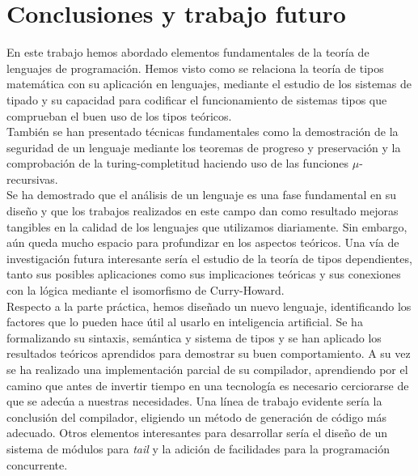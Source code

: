 \chapter{Conclusiones y trabajo futuro}
\label{sect:con}

En este trabajo hemos abordado elementos fundamentales de la teoría de lenguajes de programación. Hemos visto como se relaciona la teoría de tipos matemática con su aplicación en lenguajes, mediante el estudio de los sistemas de tipado y su capacidad para codificar el funcionamiento de sistemas tipos que comprueban el buen uso de los tipos teóricos.\\

También se han presentado técnicas fundamentales como la demostración de la seguridad de un lenguaje mediante los teoremas de progreso y preservación y la comprobación de la turing-completitud haciendo uso de las funciones $\mu$-recursivas.\\

Se ha demostrado que el análisis de un lenguaje es una fase fundamental en su diseño y que los trabajos realizados en este campo dan como resultado mejoras tangibles en la calidad de los lenguajes que utilizamos diariamente. Sin embargo, aún queda mucho espacio para profundizar en los aspectos teóricos. Una vía de investigación futura interesante sería el estudio de la teoría de tipos dependientes, tanto sus posibles aplicaciones como sus implicaciones teóricas y sus conexiones con la lógica mediante el isomorfismo de Curry-Howard.\\

Respecto a la parte práctica, hemos diseñado un nuevo lenguaje, identificando los factores que lo pueden hace útil al usarlo en inteligencia artificial. Se ha formalizando su sintaxis, semántica y sistema de tipos y se han aplicado los resultados teóricos aprendidos para demostrar su buen comportamiento. A su vez se ha realizado una implementación parcial de su compilador, aprendiendo por el camino que antes de invertir tiempo en una tecnología es necesario cerciorarse de que se adecúa a nuestras necesidades. Una línea de trabajo evidente sería la conclusión del compilador, eligiendo un método de generación de código más adecuado. Otros elementos interesantes para desarrollar sería el diseño de un sistema de módulos para \textit{tail} y la adición de facilidades para la programación concurrente.\\